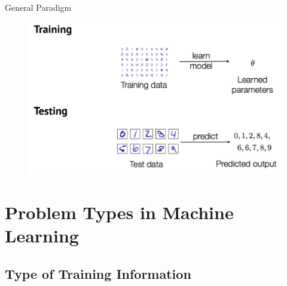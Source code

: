 \begin{frame}{General Paradigm}{}\important
	\begin{figure}
		\centering
		\includegraphics[scale=0.25]{01_intro_ml/02_img/general_paradigm}
	\end{figure}
\end{frame}


\section{Problem Types in Machine Learning}

\subsection{Type of Training Information}

